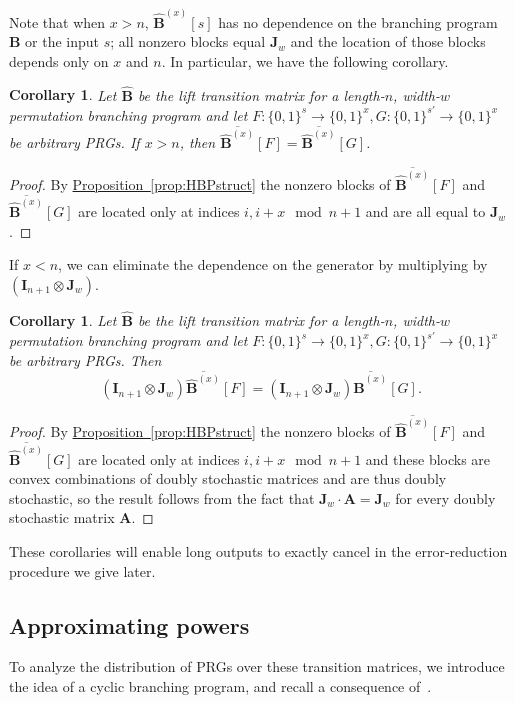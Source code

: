 \documentclass[11pt]{article}
\numberwithin{equation}{section}
\newtheorem{corollary}[theorem]{Corollary}
\theoremstyle{definition}
\theoremstyle{plain}
\newcommand{\expref}[2]{\hyperref[#2]{#1~\ref{#2}}}
\newcommand{\zo}{\{0,1\}}
\newcommand{\ra}{\rightarrow}
\newcommand{\mA}{\mathbf{A}}
\newcommand{\I}{\mathbf{I}}
\newcommand{\Jw}{\mathbf{J}_w}
\newcommand{\bp}{{\mathbf{B}}}
\newcommand{\hbp}{{\mathbf{\hat{B}}}}
\newcommand{\hbbp}[2]{\overline{\mathbf{\hat{B}}^{(#1)}}\left[#2\right]}
\begin{document}
Note that when $x>n$, $\hbp^{(x)}[s]$ has no dependence on the branching program $\bp$ or the input $s$; all nonzero blocks equal $\Jw$ and the location of those blocks depends only on $x$ and $n$. In particular, we %
have the following corollary.  %
\begin{corollary}\label{cor:longPRGtriv}
Let $\hbp$ be the lift transition matrix for a length-$n$, width-$w$ permutation branching program and let $F:\zo^s\ra\zo^x,G:\zo^{s'}\ra\zo^x$ be arbitrary PRGs. If $x>n$, then $\hbbp{x}{F}=\hbbp{x}{G}$.
\end{corollary}
\begin{proof}
By \expref{Proposition}{prop:HBPstruct} the nonzero blocks of $\hbbp{x}{F}$ and $\hbbp{x}{G}$ are located only at indices $i,i+x \mod n+1$ and are all equal to $\Jw$.
\end{proof}
If $x<n$, we can eliminate the dependence on the generator by multiplying by $(\I_{n+1}\otimes \Jw)$.
\begin{corollary}\label{cor:hbpCommutes}
Let $\hbp$ be the lift transition matrix for a length-$n$, width-$w$ permutation branching program and let $F:\zo^s\ra\zo^x,G:\zo^{s'}\ra\zo^x$ be arbitrary PRGs. Then
\[(\I_{n+1}\otimes \Jw)\hbbp{x}{F}=(\I_{n+1}\otimes \Jw)\hbbp{x}{G}.\]
\end{corollary}
\begin{proof}
By \expref{Proposition}{prop:HBPstruct} the nonzero blocks of $\hbbp{x}{F}$ and $\hbbp{x}{G}$ are located only at indices $i,i+x \mod n+1$ and these blocks are convex combinations of doubly stochastic matrices and are thus doubly stochastic, so the result follows from the fact that $\Jw\cdot\mA=\Jw$ for every doubly stochastic matrix $\mA$.
\end{proof}
These corollaries will enable long outputs to exactly cancel in the error-reduction procedure we give later.

\subsection{Approximating powers}
To analyze the distribution of PRGs over these transition matrices, we introduce the idea of a cyclic branching program, and recall a consequence of~\cite{HozaPyVa21}.
    
\end{document}
